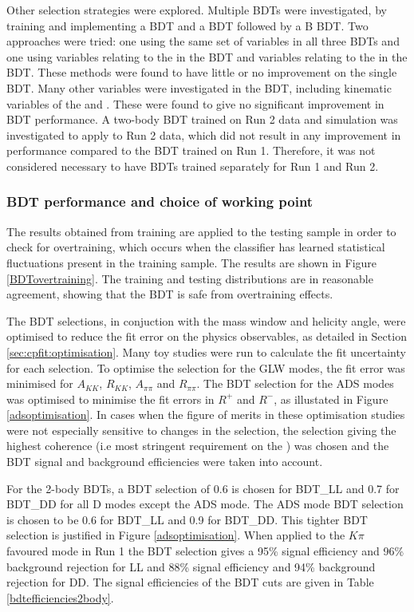 Other selection strategies were explored. Multiple BDTs were investigated, by training and implementing a \KS BDT and a \Dz BDT followed by a B BDT. Two approaches were tried: one using the same set of variables in all three BDTs and one using variables relating to the \KS in the \KS BDT and variables relating to the \Dz in the \Dz BDT. These methods were found to have little or no improvement on the single BDT. Many other variables were investigated in the BDT, including kinematic variables of the \B and \D. These were found to give no significant improvement in BDT performance. A two-body BDT trained on Run 2 data and simulation was investigated to apply to Run 2 data, which did not result in any improvement in performance compared to the BDT trained on Run 1. Therefore, it was not considered necessary to have BDTs trained separately for Run 1 and Run 2.

\subsubsection{BDT performance and choice of working point}

The results obtained from training are applied to the testing sample in order to check for overtraining, which occurs when the classifier has learned statistical fluctuations present in the training sample. The results are shown in Figure \ref{BDTovertraining}. The training and testing distributions are in reasonable agreement, showing that the BDT is safe from overtraining effects.

The BDT selections, in conjuction with the \Kstarm mass window and \KS helicity angle, were optimised to reduce the fit error on the physics observables, as detailed in Section \ref{sec:cpfit:optimisation}. Many toy studies were run to calculate the fit uncertainty for each selection. To optimise the selection for the GLW modes, the fit error was minimised for $A_{KK}$, $R_{KK}$, $A_{\pi\pi}$ and $R_{\pi\pi}$. The BDT selection for the ADS modes was optimised to minimise the fit errors in $R^+$ and $R^-$, as illustated in Figure \ref{adsoptimisation}. In cases when the figure of merits in these optimisation studies were not especially sensitive to changes in the selection, the selection giving the highest coherence (i.e most stringent requirement on the \Kstarm) was chosen and the BDT signal and background efficiencies were taken into account.

For the 2-body BDTs, a BDT selection of 0.6 is chosen for BDT\_LL and 0.7 for BDT\_DD for all D modes except the ADS mode. The ADS mode BDT selection is chosen to be 0.6 for BDT\_LL and 0.9 for BDT\_DD. This tighter BDT selection is justified in Figure \ref{adsoptimisation}. When applied to the $K\pi$ favoured mode in Run 1 the BDT selection gives a 95\% signal efficiency and 96\% background rejection for LL and 88\% signal efficiency and 94\% background rejection for DD. The signal efficiencies of the BDT cuts are given in Table \ref{bdtefficiencies2body}. 


